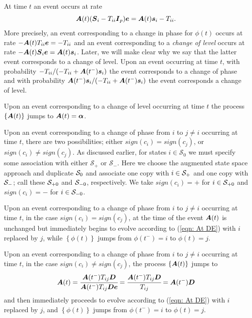 At time \(t\) an event occurs at rate 
\[\boldsymbol A(t) (\boldsymbol{S}_i - T_{ii}\boldsymbol{I}_p)\boldsymbol e = \boldsymbol A(t)\boldsymbol s_i - T_{ii}.\]
More precisely, an event corresponding to a change in phase for \({\phi}(t)\) occurs at rate \(-\boldsymbol A(t) T_{ii}\boldsymbol e = -T_{ii}\) and an event corresponding to a \emph{change of level} occurs at rate \(-\boldsymbol A(t) \boldsymbol{S}_i\boldsymbol e = \boldsymbol A(t) \boldsymbol s_i\). Later, we will make clear why we say that the latter event corresponds to a change of level. Upon an event occurring at time \(t\), with probability \({-T_{ii}}/{\left(-T_{ii} + \boldsymbol A({t^-})\boldsymbol s_i\right)}\) the event corresponds to a change of phase and with probability \({\boldsymbol A({t^-})\boldsymbol s_i}/{\left(-T_{ii} + \boldsymbol A({t^-})\boldsymbol s_i\right)}\) the event corresponds a change of level. 

Upon an event corresponding to a change of level occurring at time \(t\) the process \(\{\boldsymbol A(t)\}\) jumps to
\(\boldsymbol A(t) = \boldsymbol \alpha\). 

Upon an event corresponding to a change of phase from \(i\) to \(j\neq i\) occurring at time \(t\), there are two possibilities; either \(sign(c_i)=sign(c_j)\), or \(sign(c_i)\neq sign(c_j)\). As discussed earlier, for states \(i\in\mathcal S_0\) we must specify some association with either \(\mathcal S_+\) or \(\mathcal S_-\). Here we choose the augmented state space approach and duplicate \(\mathcal{S}_0\) and associate one copy with \(i\in\mathcal{S}_+\) and one copy with \(\mathcal{S}_-\); call these \(\mathcal{S}_{+0}\) and \(\mathcal{S}_{-0}\), respectively. We take \(sign(c_i)=+\) for \(i\in\mathcal{S}_{+0}\) and \(sign(c_i)=-\) for \(i\in\mathcal{S}_{-0}\).

Upon an event corresponding to a change of phase from \(i\) to \(j\neq i\) occurring at time \(t\), in the case \(sign(c_i)=sign(c_j)\), at the time of the event \(\boldsymbol A(t)\) is unchanged but immediately begins to evolve according to (\ref{eqn: At DE}) with \(i\) replaced by \(j\), while \(\left\{{\phi}(t)\right\}\) jumps from \({\phi}(t^-)=i\) to \({\phi}(t)=j\). 

Upon an event corresponding to a change of phase from \(i\) to \(j\neq i\) occurring at time \(t\), in the case \(sign(c_i)\neq sign(c_j)\), the process \(\{\boldsymbol A(t)\}\) jumps to 
\[\boldsymbol A(t) = \cfrac{\boldsymbol A({t^-}) T_{ij}\boldsymbol{D}}{\boldsymbol A({t^-}) T_{ij} \boldsymbol{D} \boldsymbol e} = \cfrac{\boldsymbol A({t^-}) T_{ij}\boldsymbol{D}}{T_{ij} } = \boldsymbol A({t^-}) \boldsymbol{D} \] 
and then immediately proceeds to evolve according to (\ref{eqn: At DE}) with \(i\) replaced by \(j\), and \(\left\{{\phi}(t)\right\}\) jumps from \({\phi}(t^-)=i\) to \({\phi}(t)=j\). 

